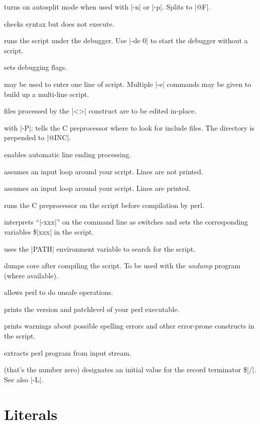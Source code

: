 \begin{enum}{1cm}

 turns on autosplit mode when used with |-n| or
|-p|. Splits to |@F|.

 checks syntax but does not execute.

 runs the script under the debugger. Use |-de 0| to
start the debugger without a script.

 sets debugging flags. 

 may be used to enter one line of
script. Multiple |-e| commands may be given to build up a
multi-line script.

 files processed by the |<>| construct are
to be edited in-place.

 with |-P|: tells the C preprocessor where
to look for include files. The directory is prepended to |@INC|.

 enables automatic line ending processing.

 assumes an input loop around your script. Lines are not
printed.

 assumes an input loop around your script. Lines are
printed.

 runs the C preprocessor on the script before
compilation by perl.

 interprets ``|-xxx|'' on the command line as
switches and sets the corresponding variables \$|xxx| in the script.

 uses the |PATH| environment variable to search for
the script.

 dumps core after compiling the script. To be used with
the {\it undump\/} program (where available).

 allows perl to do unsafe operations.

 prints the version and patchlevel of your perl
executable.

 prints warnings about possible spelling errors and
other error-prone constructs in the script.

 extracts perl program from input stream.

 (that's the number zero) designates an
initial value for the record terminator \$|/|.
See also |-L|.

\end{enum}
\makeuppage
\section{Literals} 

